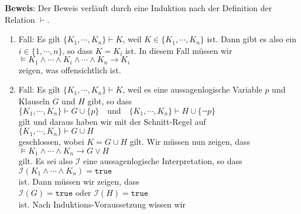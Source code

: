 \noindent
\textbf{Beweis}:  Der Beweis verläuft durch eine Induktion nach der Definition der Relation $\vdash$. 
\begin{enumerate}
\item Fall: Es gilt $\{ K_1, \cdots, K_n \} \vdash K$, weil $K \in \{ K_1, \cdots, K_n \}$ ist.  
      Dann gibt es also ein $i \in \{1,\cdots,n\}$, so dass $K = K_i$ ist.  In diesem Fall
      müssen wir
      \\[0.2cm]
      \hspace*{1.3cm}
      $\models K_1 \wedge \cdots \wedge K_i \wedge \cdots \wedge K_n \rightarrow K_i$
      \\[0.2cm]
      zeigen, was offensichtlich ist.
\item Fall: Es gilt $\{ K_1, \cdots, K_n \} \vdash K$, weil es eine aussagenlogische
      Variable $p$ und Klauseln $G$ und $H$ gibt, so dass 
      \\[0.2cm]
      \hspace*{1.3cm}
      $\{ K_1, \cdots, K_n \} \vdash G \cup \{ p \} \quad \mathrm{und} \quad
         \{ K_1, \cdots, K_n \} \vdash H \cup \{ \neg p \}
      $
      \\[0.2cm]
      gilt und daraus haben wir mit der Schnitt-Regel auf
      \\[0.2cm]
      \hspace*{1.3cm}
      $\{ K_1, \cdots, K_n \} \vdash G \cup H$
      \\[0.2cm]
      geschlossen, wobei $K = G \cup H$ gilt.  Wir müssen nun zeigen, dass 
      \\[0.2cm]
      \hspace*{1.3cm}
      $\models K_1 \wedge \cdots \wedge K_n \rightarrow G \vee H$
      \\[0.2cm]
      gilt.  Es sei also $\mathcal{I}$ eine aussagenlogische Interpretation, so dass
      \\[0.2cm]
      \hspace*{1.3cm}
      $\mathcal{I}(K_1 \wedge \cdots \wedge K_n) = \mathtt{true}$  
      \\[0.2cm]
      ist. Dann müssen wir zeigen, dass 
      \\[0.2cm]
      \hspace*{1.3cm}
      $\mathcal{I}(G) = \mathtt{true}$ \quad oder \quad $\mathcal{I}(H) = \mathtt{true}$
      \\[0.2cm]
      ist.  Nach Induktions-Voraussetzung wissen wir
      \\[0.2cm]
      \hspace*{1.3cm}

\end{enumerate}
